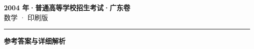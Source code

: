 \documentclass[zihao=5, a4paper]{ctexart}
\begin{document}
\begin{center}
  {\Large\bfseries 2004 年·普通高等学校招生考试·广东卷}\\[4pt]
  {\large 数学 · 印刷版}
\end{center}
\medskip
{}

\par\bigskip\hrule\bigskip
{}
\begin{center}{\large\bfseries 参考答案与详细解析}\end{center}
\smallskip

\end{document}
